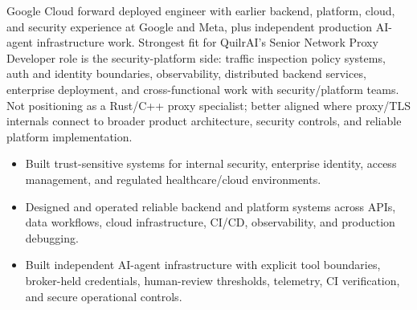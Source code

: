 


Google Cloud forward deployed engineer with earlier backend, platform, cloud, and security experience at Google and Meta, plus independent production AI-agent infrastructure work. Strongest fit for QuilrAI's Senior Network Proxy Developer role is the security-platform side: traffic inspection policy systems, auth and identity boundaries, observability, distributed backend services, enterprise deployment, and cross-functional work with security/platform teams. Not positioning as a Rust/C++ proxy specialist; better aligned where proxy/TLS internals connect to broader product architecture, security controls, and reliable platform implementation.
\begin{itemize}
  \item Built trust-sensitive systems for internal security, enterprise identity, access management, and regulated healthcare/cloud environments.
  \item Designed and operated reliable backend and platform systems across APIs, data workflows, cloud infrastructure, CI/CD, observability, and production debugging.
  \item Built independent AI-agent infrastructure with explicit tool boundaries, broker-held credentials, human-review thresholds, telemetry, CI verification, and secure operational controls.
\end{itemize}







